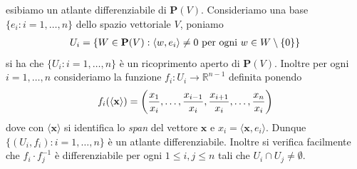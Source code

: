 \documentclass[oneside, 11pt]{amsbook}
\makeatletter
\newcommand{\0}{{(0)}}
\newcommand{\3}{{(3)}}
\theoremstyle{colonplain}
\theoremstyle{colondefinition}
\theoremstyle{colonremark}
\numberwithin{equation}{chapter}
\renewcommand{\proofname}{Dimostrazione}
\renewenvironment{proof}[1][\proofname]{\par
  \pushQED{\qed}%
  \normalfont \topsep6\p@\@plus6\p@\relax
  \trivlist
  \item[\hskip\labelsep\bfseries #1:]\ignorespaces
}{%
  \popQED\endtrivlist\@endpefalse
}
\makeatother
\begin{document}
\begin{proof} esibiamo un atlante differenziabile di $\mathbf{P}(V)$. Consideriamo una base $\{ e_i : i = 1, \dots, n \}$ dello spazio vettoriale $V$, poniamo
\begin{align}
    U_i = \{ W \in \mathbf{P}(V) : \langle w, e_i \rangle \neq 0 \text{ per ogni } w \in W \setminus \{ 0 \} \} \notag
\end{align}
si ha che $\{ U_i : i = 1, \dots, n \}$ è un ricoprimento aperto di $\mathbf{P}(V)$. Inoltre per ogni $i = 1, \dots, n$ consideriamo la funzione $f_i : U_i \longrightarrow \mathbb{R}^{n - 1}$ definita ponendo
\begin{align}
    f_i(\langle \mathbf{x} \rangle) = \left( \frac{x_1}{x_i}, \dots, \frac{x_{i - 1}}{x_i}, \frac{x_{i + 1}}{x_i}, \dots, \frac{x_n}{x_i} \right) \notag
\end{align}
dove con $\langle \mathbf{x} \rangle$ si identifica lo \textit{span} del vettore $\mathbf{x}$ e $x_i = \langle \mathbf{x}, e_i \rangle$. Dunque $\{ (U_i, f_i) : i = 1, \dots, n \}$ è un atlante differenziabile. Inoltre si verifica facilmente che $f_i \cdot f_j^{-1}$ è differenziabile per ogni $1 \leq i, j \leq n$ tali che $U_i \cap U_j \neq \emptyset$.
\end{proof}
\end{document}

